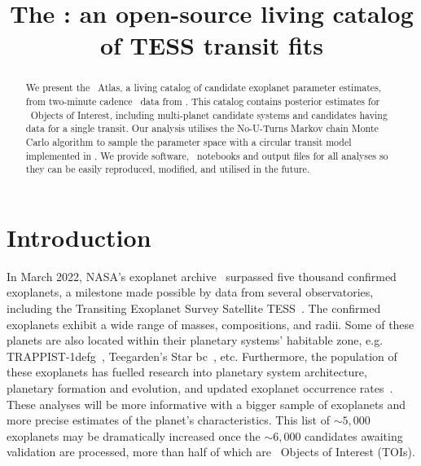 \documentclass[floatfix,ApJL,twocolumn]{aastex631}
\begin{document}
\title{The \tessAtlas: an open-source living catalog of TESS transit fits}







\begin{abstract}
We present the \tess\ Atlas, a living catalog of candidate exoplanet parameter estimates, from two-minute cadence \tess\ data from .
This catalog contains posterior estimates for \red{\numAnalysed} \tess\ Objects of Interest, including \red{\numMultiSystems} multi-planet candidate systems and \red{\numAnalysedSingle} candidates having data for a single transit.
Our analysis utilises the No-U-Turns Markov chain Monte Carlo algorithm to sample the parameter space with a circular transit model implemented in \exoplanet.
We provide software, \jupyter\ notebooks and output files for all analyses so they can be easily reproduced, modified, and utilised in the future.
\end{abstract}




\section{Introduction} \label{sec:intro}

In March 2022, NASA's exoplanet archive~\citep{Akeson:2013:PASP} surpassed five thousand confirmed exoplanets, a milestone made possible by data from several observatories, including the Transiting Exoplanet Survey Satellite TESS~\citep{Ricker:2015:JATIS, Stassun:2018:AJ, Stassun:2019:AJ, Guerrero:2021:ApJS}.
The confirmed exoplanets exhibit a wide range of masses, compositions, and radii.
Some of these planets are also located within their planetary systems' habitable zone, e.g. TRAPPIST-1defg~\citep{Gillon:2017:Natur, Wolf:2017:ApJL, Agol:2021:PSJ}, Teegarden's Star bc~\citep{Zechmeister:2019:AA}, etc.
Furthermore, the population of these exoplanets has fuelled research into planetary system architecture, planetary formation and evolution, and updated exoplanet occurrence rates~\citep{Winn:2015:ARAA, Sing:2016:Natur, Emsenhuber:2021:AA, Zhu:2021:ARAA}.
These analyses will be more informative with a bigger sample of exoplanets and more precise estimates of the planet's characteristics.
This list of $\sim5,000$ exoplanets may be dramatically increased once the $\sim6,000$ candidates awaiting validation are processed, more than half of which are \tess\ Objects of Interest (TOIs).
\end{document}
